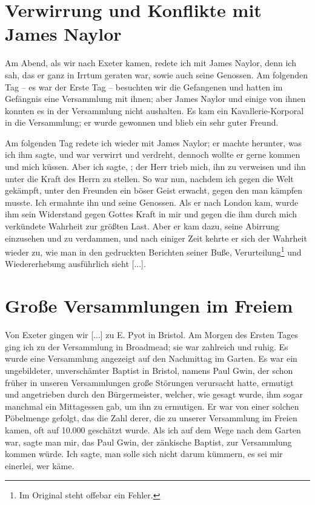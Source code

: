 \section{Verwirrung und Konflikte mit James Naylor}

Am Abend, als wir nach Exeter kamen, redete ich mit James
Naylor, denn ich sah, das er ganz in Irrtum geraten war, sowie
auch seine Genossen. Am folgenden Tag -- es war der Erste
Tag -- besuchten wir die Gefangenen und hatten im Gefängnis
eine Versammlung mit ihnen; aber James Naylor und einige
von ihnen konnten es in der Versammlung nicht aushalten. Es
kam ein Kavallerie-Korporal in die Versammlung; er wurde 
gewonnen und blieb ein sehr guter Freund.


Am folgenden Tag redete ich wieder mit James Naylor; er
machte herunter, was ich ihm sagte, und war verwirrt und 
verdreht, dennoch wollte er gerne kommen und mich küssen. Aber
ich sagte, ; 
der Herr trieb mich, ihn zu verweisen und ihn unter die Kraft 
des Herrn zu stellen. So war nun, nachdem ich gegen die Welt 
gekämpft, unter den Freunden ein böser Geist erwacht, gegen 
den man kämpfen musste. Ich ermahnte ihn und seine Genossen. 
Als er nach London kam, wurde ihm sein Widerstand 
gegen Gottes Kraft in
mir und gegen die ihm durch mich verkündete Wahrheit zur
größten Last. Aber er kam dazu, seine Abirrung einzusehen und
zu verdammen, und nach einiger Zeit kehrte er 
sich der Wahrheit
wieder zu, wie man in den gedruckten Berichten seiner Buße,
Verurteilung\footnote{Im Original steht 
 offebar ein Fehler.} und 
Wiedererhebung ausführlich sieht [...].

\section{Große Versammlungen im Freiem}

Von Exeter gingen wir [...] zu E. Pyot 
in Bristol. Am
Morgen des Ersten Tages ging ich zu der Versammlung in
Broadmead; sie war zahlreich und ruhig. 
Es wurde eine Versammlung angezeigt auf den Nachmittag 
im Garten. Es war
ein ungebildeter, unverschämter Baptist in Bristol, namens Paul
Gwin, der schon früher in unseren 
Versammlungen große Störungen
verursacht hatte, ermutigt und angetrieben durch den 
Bürgermeister, welcher, wie gesagt wurde, ihm sogar manchmal ein
Mittagessen gab, um ihn zu ermutigen. Er war von einer
solchen Pöbelmenge gefolgt, das die Zahl derer, die zu unserer
Versammlung im Freien kamen, oft auf 10.000 geschätzt 
wurde.
Als ich auf dem Wege nach dem Garten war, sagte man mir,
das Paul Gwin, der zänkische Baptist, zur Versammlung kommen
würde. Ich sagte, man solle sich nicht darum kümmern, es sei
mir einerlei, wer käme. 



